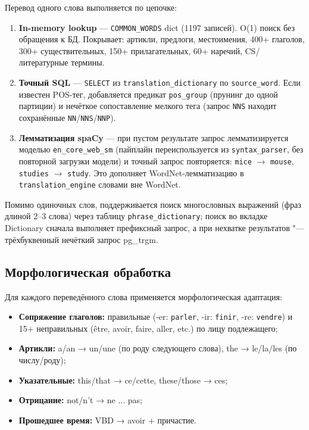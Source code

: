 Перевод одного слова выполняется по цепочке:

\begin{enumerate}
	\item \textbf{In-memory lookup} --- \texttt{COMMON\_WORDS} dict (1197 записей).
	      O(1) поиск без обращения к БД. Покрывает: артикли, предлоги,
	      местоимения, 400+ глаголов, 300+ существительных, 150+ прилагательных,
	      60+ наречий, CS/литературные термины.
	\item \textbf{Точный SQL} --- \texttt{SELECT} из
	      \texttt{translation\_dictionary} по \texttt{source\_word}. Если известен
	      POS-тег, добавляется предикат \texttt{pos\_group} (прунинг до одной
	      партиции) и нечёткое сопоставление мелкого тега
	      (запрос \texttt{NNS} находит сохранённые \texttt{NN}/\texttt{NNS}/\texttt{NNP}).
	\item \textbf{Лемматизация spaCy} --- при пустом результате запрос
	      лемматизируется моделью \texttt{en\_core\_web\_sm} (пайплайн
	      переиспользуется из \texttt{syntax\_parser}, без повторной загрузки
	      модели) и точный запрос повторяется: \texttt{mice} $\to$ \texttt{mouse},
	      \texttt{studies} $\to$ \texttt{study}. Это дополняет WordNet-лемматизацию
	      в \texttt{translation\_engine} словами вне WordNet.
\end{enumerate}

Помимо одиночных слов, поддерживается поиск многословных выражений
(фраз длиной 2--3 слова) через таблицу \texttt{phrase\_dictionary};
поиск во вкладке Dictionary сначала выполняет префиксный запрос,
а при нехватке результатов "--- трёхбуквенный нечёткий запрос pg\_trgm.

\subsection{Морфологическая обработка}

Для каждого переведённого слова применяется морфологическая адаптация:

\begin{itemize}
	\item \textbf{Сопряжение глаголов:} правильные (-er: \texttt{parler},
	      -ir: \texttt{finir}, -re: \texttt{vendre}) и 15+ неправильных
	      (être, avoir, faire, aller, etc.) по лицу подлежащего;
	\item \textbf{Артикли:} a/an → un/une (по роду следующего слова),
	      the → le/la/les (по числу/роду);
	\item \textbf{Указательные:} this/that → ce/cette, these/those → ces;
	\item \textbf{Отрицание:} not/n't → ne ... pas;
	\item \textbf{Прошедшее время:} VBD → avoir + причастие.
\end{itemize}


